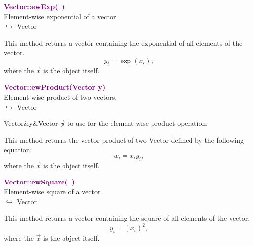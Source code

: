 \textcolor{purple}{\textbf{Vector::ewExp(~)}}\label{Vector::ewExp()}\\
Element-wise exponential of a vector\\ \hspace*{10mm}$\hookrightarrow$ Vector

This method returns a vector containing the exponential of all elements of the vector.
\begin{equation*}
y_i = \exp(x_i),
\end{equation*}
where the $\overrightarrow{x}$ is the object itself.

\textcolor{purple}{\textbf{Vector::ewProduct(Vector y)}}\label{Vector::ewProduct(Vector y)}\\
Element-wise product of two vectors.\\ \hspace*{10mm}$\hookrightarrow$ Vector

\begin{tcolorbox}[width=\textwidth,myArgs,tabularx={ll|R}]
Vector&y&Vector $\overrightarrow{y}$ to use for the element-wise product operation.
\end{tcolorbox}

This method returns the vector product of two Vector defined by the following equation:
\begin{equation*}
w_i = x_i y_i,
\end{equation*}
where the $\overrightarrow{x}$ is the object itself.

\textcolor{purple}{\textbf{Vector::ewSquare(~)}}\label{Vector::ewSquare()}\\
Element-wise square of a vector\\ \hspace*{10mm}$\hookrightarrow$ Vector

This method returns a vector containing the square of all elements of the vector.
\begin{equation*}
y_i = (x_i)^2,
\end{equation*}
where the $\overrightarrow{x}$ is the object itself.

